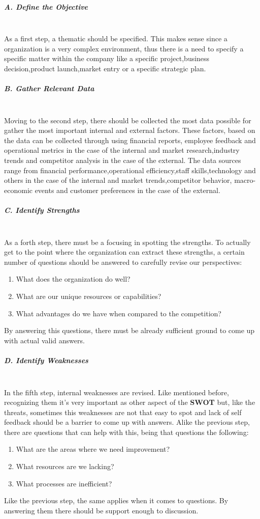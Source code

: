 \subparagraph{A. Define the Objective}\mbox{}\\
As a first step, a thematic should be specified. This makes sense since a organization is a very complex environment, thus there is a need to specify a specific matter within the company like a specific project,business decision,product launch,market entry or a specific strategic plan.

\subparagraph{B. Gather Relevant Data}\mbox{}\\
Moving to the second step, there should be collected the most data possible for gather the most important internal and external factors. These factors, based on the data can be collected through using financial reports, employee feedback and operational metrics in the case of the internal and market research,industry trends and competitor analysis in the case of the external. The data sources range from financial performance,operational efficiency,staff skills,technology and others in the case of the internal and market trends,competitor behavior, macro-economic events and customer preferences in the case of the external.

\subparagraph{C. Identify Strengths}\mbox{}\\
As a forth step, there must be a focusing in spotting the strengths. To actually get to the point where the organization can extract these strengths, a certain number of questions should be answered to carefully revise our perspectives:
\begin{enumerate}
    \item What does the organization do well?
    \item What are our unique resources or capabilities?
    \item What advantages do we have when compared to the competition?
\end{enumerate}
By answering this questions, there must be already sufficient ground to come up with actual valid answers.

\subparagraph{D. Identify Weaknesses}\mbox{}\\
In the fifth step, internal weaknesses are revised. Like mentioned before, recognizing them it's very important as other aspect of the \textbf{SWOT} but, like the threats, sometimes this weaknesses are not that easy to spot and lack of self feedback should be a barrier to come up with answers. Alike the previous step, there are questions that can help with this, being that questions the following:
\begin{enumerate}
    \item What are the areas where we need improvement?
    \item What resources are we lacking?
    \item What processes are inefficient?
\end{enumerate}
Like the previous step, the same applies when it comes to questions. By answering them there should be support enough to discussion.

